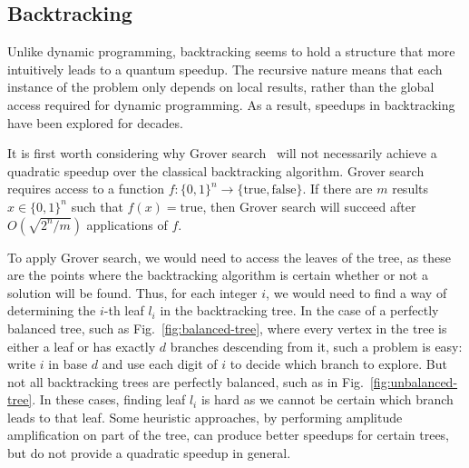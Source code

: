 \subsection{Backtracking}
\label{sec:q-backtrack}

Unlike dynamic programming, backtracking seems to hold a structure that more intuitively leads to a quantum speedup. The recursive nature means that each instance of the problem only depends on local results, rather than the global access required for dynamic programming. As a result, speedups in backtracking have been explored for decades.

It is first worth considering why Grover search~\cite{grover96} will not necessarily achieve a quadratic speedup over the classical backtracking algorithm. Grover search requires access to a function $f \colon \{0,1\}^n \rightarrow \{\text{true}, \text{false}\}$. If there are $m$ results $x \in \{0,1\}^n$ such that $f(x) = \text{true}$, then Grover search will succeed after $O(\sqrt{2^n/m})$ applications of $f$\cite{grover96}.

To apply Grover search, we would need to access the leaves of the tree, as these are the points where the backtracking algorithm is certain whether or not a solution will be found. Thus, for each integer $i$, we would need to find a way of determining the $i$-th leaf $l_i$ in the backtracking tree. In the case of a perfectly balanced tree, such as Fig.\ \ref{fig:balanced-tree}, where every vertex in the tree is either a leaf or has exactly $d$ branches descending from it, such a problem is easy: write $i$ in base $d$ and use each digit of $i$ to decide which branch to explore. But not all backtracking trees are perfectly balanced, such as in Fig.\ \ref{fig:unbalanced-tree}. In these cases, finding leaf $l_i$ is hard as we cannot be certain which branch leads to that leaf. Some heuristic approaches, by performing amplitude amplification on part of the tree, can produce better speedups for certain trees, but do not provide a quadratic speedup in general.


